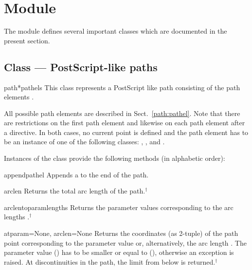\section{Module }


\label{path}

The  module defines several important classes which are
documented in the present section.

\subsection{Class  --- PostScript-like paths}

\label{path:path}


\begin{classdesc}{path}{*pathels}
This class represents a PostScript like path consisting of the
path elements .

All possible path elements are described in Sect.~\ref{path:pathel}.
Note that there are restrictions on the first path element and likewise
on each path element after a  directive. In both cases,
no current point is defined and the path element has to be an instance
of one of the following classes: , , and
.
\end{classdesc}

Instances of the class  provide the following
methods (in alphabetic order):

\begin{methoddesc}{append}{pathel}
Appends a  to the end of the path.
\end{methoddesc}

\begin{methoddesc}{arclen}{}
Returns the total arc length of the path.$^\dagger$
\end{methoddesc}

\begin{methoddesc}{arclentoparam}{lengths}
  Returns the parameter values corresponding to the arc lengths
  .$^\dagger$
\end{methoddesc}

\begin{methoddesc}{at}{param=None, arclen=None}
  Returns the coordinates (as 2-tuple) of the path point corresponding to the
  parameter value  or, alternatively, the arc length
  . The parameter value  () has to be smaller
  or equal to  (),
  otherwise an exception is raised.  At discontinuities in the path,
  the limit from below is returned.$^\dagger$
\end{methoddesc}

